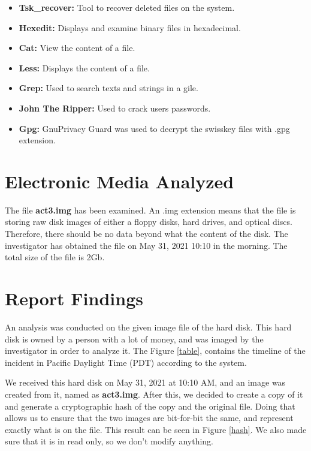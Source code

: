 \documentclass[a4paper,12pt]{article}
\begin{document}
\begin{itemize}
\item \textbf{Tsk\_recover:} Tool to recover deleted files on the system.
\item \textbf{Hexedit:} Displays and examine binary files in hexadecimal. 
\item \textbf{Cat:} View the content of a file.
\item \textbf{Less:} Displays the content of a file.
\item \textbf{Grep:} Used to search texts and strings in a gile.
\item \textbf{John The Ripper:} Used to crack users passwords.
\item \textbf{Gpg:} GnuPrivacy Guard was used to decrypt the swisskey files with .gpg extension.
\end{itemize}
 
\section{Electronic Media Analyzed}
The file \textbf{act3.img} has been examined. An .img extension means that the file is storing raw disk images of either a floppy disks, hard drives, and optical discs. Therefore, there should be no data beyond what the content of the disk. The investigator has obtained the file on May 31, 2021 10:10 in the morning. The total size of the file is 2Gb. 
 
\section{Report Findings}


An analysis was conducted on the given image file of the hard disk. This hard disk is owned by a person with a lot of money, and was imaged by the investigator in order to analyze it. The Figure \ref{table}, contains the timeline of the incident in Pacific Daylight Time (PDT) according to the system. 

We received this hard disk on May 31, 2021 at 10:10 AM, and an image was created from it, named as \textbf{act3.img}. After this, we decided to create a copy of it and generate a cryptographic hash of the copy and the original file. Doing that allows us to ensure that the two images are bit-for-bit the same, and represent exactly what is on the file. This result can be seen in Figure \ref{hash}. We also made sure that it is in read only, so we don't modify anything. 
\end{document}
